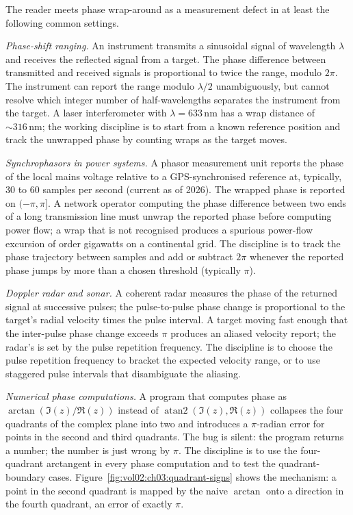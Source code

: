 The reader meets phase wrap-around as a measurement defect in at
least the following common settings.

\textit{Phase-shift ranging.} An instrument transmits a sinusoidal
signal of wavelength $\lambda$ and receives the reflected signal
from a target. The phase difference between transmitted and
received signals is proportional to twice the range, modulo
$2\pi$. The instrument can report the range modulo $\lambda/2$
unambiguously, but cannot resolve which integer number of
half-wavelengths separates the instrument from the target. A
laser interferometer with $\lambda = 633 \,\si{\nano\meter}$ has
a wrap distance of $\sim 316 \,\si{\nano\meter}$; the working
discipline is to start from a known reference position and
track the unwrapped phase by counting wraps as the target moves.

\textit{Synchrophasors in power systems.} A phasor measurement
unit reports the phase of the local mains voltage relative to a
GPS-synchronised reference at, typically, $30$ to $60$ samples
per second (current as of 2026). The wrapped phase is reported on
$(-\pi, \pi]$. A network operator computing the phase difference
between two ends of a long transmission line must unwrap the
reported phase before computing power flow; a wrap that is not
recognised produces a spurious power-flow excursion of order
gigawatts on a continental grid. The discipline is to track the
phase trajectory between samples and add or subtract $2\pi$
whenever the reported phase jumps by more than a chosen threshold
(typically $\pi$).

\textit{Doppler radar and sonar.} A coherent radar measures the
phase of the returned signal at successive pulses; the
pulse-to-pulse phase change is proportional to the target's
radial velocity times the pulse interval. A target moving fast
enough that the inter-pulse phase change exceeds $\pi$ produces
an aliased velocity report; the radar's  is set by the pulse repetition frequency. The
discipline is to choose the pulse repetition frequency to bracket
the expected velocity range, or to use staggered pulse intervals
that disambiguate the aliasing.

\textit{Numerical phase computations.} A program that computes
phase as $\arctan(\Im(z)/\Re(z))$ instead of
$\operatorname{atan2}(\Im(z), \Re(z))$ collapses the four
quadrants of the complex plane into two and introduces a
$\pi$-radian error for points in the second and third quadrants.
The bug is silent: the program returns a number; the number is
just wrong by $\pi$. The discipline is to use the four-quadrant
arctangent in every phase computation and to test the
quadrant-boundary cases.
Figure~\ref{fig:vol02:ch03:quadrant-signs} shows the mechanism: a
point in the second quadrant is mapped by the naive $\arctan$ onto a
direction in the fourth quadrant, an error of exactly $\pi$.

